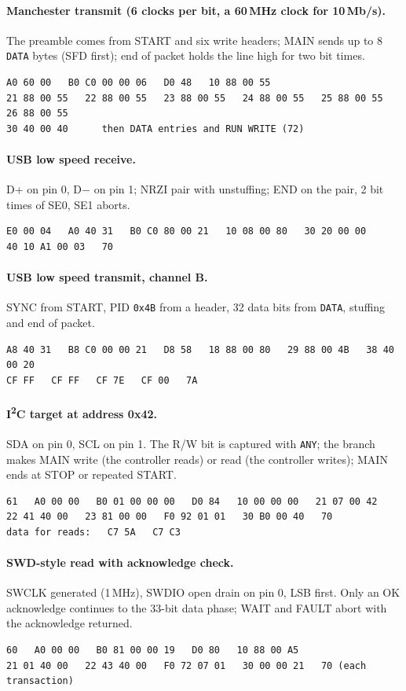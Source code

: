 \documentclass[11pt,a4paper]{article}
\newcommand{\sig}[1]{\texttt{#1}}
\begin{document}
\paragraph{Manchester transmit (6 clocks per bit, a 60\,MHz clock for 10\,Mb/s).} The preamble comes from START and six write headers; MAIN sends up to 8 \sig{DATA} bytes (SFD first); end of packet holds the line high for two bit times.
\begin{lstlisting}
A0 60 00   B0 C0 00 00 06   D0 48   10 88 00 55
21 88 00 55   22 88 00 55   23 88 00 55   24 88 00 55   25 88 00 55   26 88 00 55
30 40 00 40      then DATA entries and RUN WRITE (72)
\end{lstlisting}


\paragraph{USB low speed receive.} D+ on pin 0, D$-$ on pin 1; NRZI pair with unstuffing; END on the pair, 2 bit times of SE0, SE1 aborts.
\begin{lstlisting}
E0 00 04   A0 40 31   B0 C0 80 00 21   10 08 00 80   30 20 00 00
40 10 A1 00 03   70
\end{lstlisting}


\paragraph{USB low speed transmit, channel B.} SYNC from START, PID \texttt{0x4B} from a header, 32 data bits from \sig{DATA}, stuffing and end of packet.
\begin{lstlisting}
A8 40 31   B8 C0 00 00 21   D8 58   18 88 00 80   29 88 00 4B   38 40 00 20
CF FF   CF FF   CF 7E   CF 00   7A
\end{lstlisting}


\paragraph{I\textsuperscript{2}C target at address 0x42.} SDA on pin 0, SCL on pin 1. The R/W bit is captured with \sig{ANY}; the branch makes MAIN write (the controller reads) or read (the controller writes); MAIN ends at STOP or repeated START.
\begin{lstlisting}
61   A0 00 00   B0 01 00 00 00   D0 84   10 00 00 00   21 07 00 42
22 41 40 00   23 81 00 00   F0 92 01 01   30 B0 00 40   70
data for reads:   C7 5A   C7 C3
\end{lstlisting}


\paragraph{SWD-style read with acknowledge check.} SWCLK generated (1\,MHz), SWDIO open drain on pin 0, LSB first. Only an OK acknowledge continues to the 33-bit data phase; WAIT and FAULT abort with the acknowledge returned.
\begin{lstlisting}
60   A0 00 00   B0 81 00 00 19   D0 80   10 88 00 A5
21 01 40 00   22 43 40 00   F0 72 07 01   30 00 00 21   70 (each transaction)
\end{lstlisting}
\end{document}
